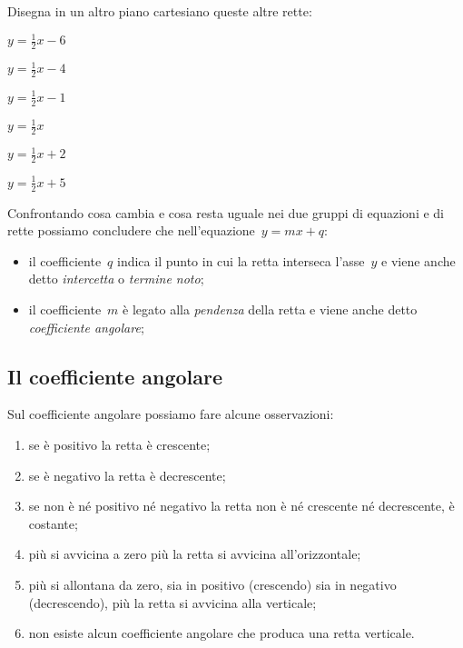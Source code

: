Disegna in un altro piano cartesiano queste altre rette:

\begin{multicols}{3}
 \TabPositions{0.6cm}
 \begin{enumeratea}
 \item $y=\frac{1}{2}x - 6$
 \item $y=\frac{1}{2}x -4$
 \item $y=\frac{1}{2}x -1$
 \item $y=\frac{1}{2}x$
 \item $y=\frac{1}{2}x + 2$
 \item $y=\frac{1}{2}x + 5$
 \end{enumeratea}
\end{multicols}

Confrontando cosa cambia e cosa resta uguale nei due gruppi di equazioni 
e di rette possiamo concludere che nell'equazione~$y=mx+q$:

\begin{itemize}
 \item il coefficiente~$q$ indica il punto in cui la retta interseca 
  l'asse~$y$ e viene anche detto \emph{intercetta} o \emph{termine noto};
 \item il coefficiente~$m$ è legato alla \emph{pendenza} della retta
  e viene anche detto \emph{coefficiente angolare};
\end{itemize}

\subsection{Il coefficiente angolare}

Sul coefficiente angolare possiamo fare alcune osservazioni:

\begin{enumerate}
 \item se è positivo la retta è crescente;
 \item se è negativo la retta è decrescente;
 \item se non è né positivo né negativo la retta non è né crescente né
 decrescente, è costante;
 \item più si avvicina a zero più la retta si avvicina all'orizzontale;
 \item più si allontana da zero, sia in positivo (crescendo) sia in
  negativo (decrescendo), più la retta si avvicina alla verticale;
 \item non esiste alcun coefficiente angolare che produca 
  una retta verticale.
\end{enumerate}

